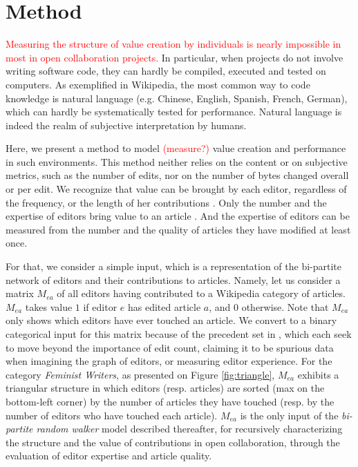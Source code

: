 \section{Method}
\label{method}
\textcolor{red}{Measuring the structure of value creation by individuals is nearly impossible in most in open collaboration projects.} In particular, when projects do not involve writing software code, they can hardly be compiled, executed and tested on computers. As exemplified in Wikipedia, the most common way to code knowledge is natural language (e.g. Chinese, English, Spanish, French, German), which can hardly be systematically tested for performance. Natural language is indeed the realm of subjective interpretation by humans. 

Here, we present a method to model \textcolor{red}{(measure?)} value creation and performance in such environments. This method neither relies on the content or on subjective metrics, such as the number of edits, nor on the number of bytes changed overall or per edit. We recognize that value can be brought by each editor, regardless of the frequency, or the length of her contributions \cite{}. Only the number and the expertise of editors bring value to an article \cite{wilkinson2007}.  And the expertise of editors can be measured from the number and the quality of articles they have modified at least once.

For that, we consider a simple input, which is a representation of the bi-partite network of editors and their contributions to articles.  Namely, let us consider a matrix $M_{ea}$ of all editors having contributed to a Wikipedia category of articles. $M_{ea}$ takes value $1$ if editor $e$ has edited article $a$, and $0$ otherwise. Note that $M_{ea}$ only shows which editors have ever touched an article. We convert to a binary categorical input for this matrix because of the precedent set in \cite{kane2011,keegan2012,geiger2013}, which each seek to move beyond the importance of edit count, claiming it to be spurious data when imagining the graph of editors, or measuring editor experience. For the category {\it Feminist Writers}, as presented on Figure \ref{fig:triangle}, $M_{ea}$ exhibits a triangular structure in which editors (resp. articles) are sorted (max on the bottom-left corner) by the number of articles they have touched (resp. by the number of editors who have touched each article). $M_{ea}$ is the only input of the {\it bi-partite random walker} model described thereafter, for recursively characterizing the structure and the value of contributions in open collaboration, through the evaluation of editor expertise and article quality.

